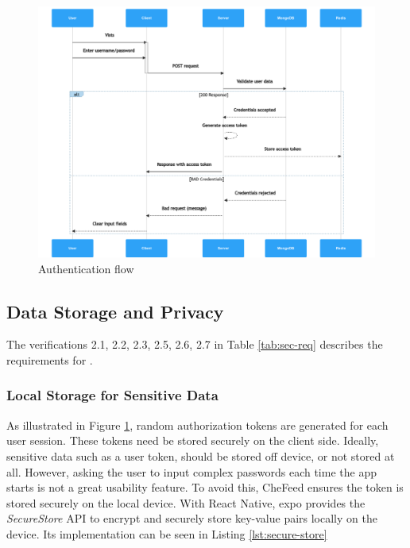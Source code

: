 \begin{figure}
    \centering
    \includegraphics[width=\textwidth]{../../img/chapter-4/auth-flow.png}
    \caption{Authentication flow}
    \label{fig:auth-flow}
\end{figure}

\subsection{Data Storage and Privacy}
The verifications 2.1, 2.2, 2.3, 2.5, 2.6, 2.7 in Table \ref{tab:sec-req} describes the requirements for .

\subsubsection{Local Storage for Sensitive Data}
As illustrated in Figure \ref{fig:auth-flow}, random authorization tokens are generated for each user session. These tokens need be stored securely on the client side. Ideally, sensitive data such as a user token, should be stored off device, or not stored at all. However,  asking the user to input complex passwords each time the app starts is not a great usability feature. To avoid this, CheFeed ensures the token is stored securely on the local device. With React Native, expo provides the \textit{SecureStore} API to encrypt and securely store key-value pairs locally on the device. Its implementation can be seen in Listing \ref{lst:secure-store}


